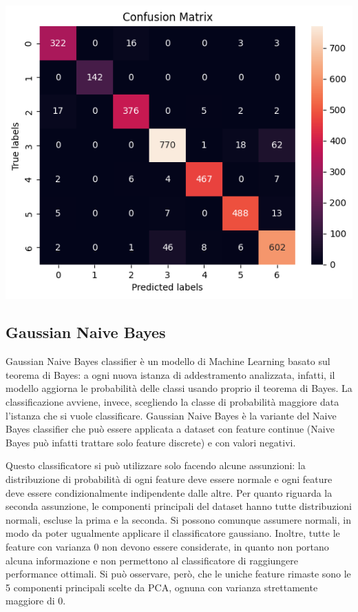 \begin{Figure}
    \centering
    \includegraphics[width=\linewidth]{img/svm_confusion_matrix.png}
\end{Figure}

\subsection{Gaussian Naive Bayes}
Gaussian Naive Bayes classifier è un modello di Machine Learning basato sul
teorema di Bayes: a ogni nuova istanza di addestramento analizzata, infatti,
il modello aggiorna le probabilità delle classi usando proprio il teorema di Bayes.
La classificazione avviene, invece, scegliendo la classe di probabilità maggiore
data l'istanza che si vuole classificare.
Gaussian Naive Bayes è la variante del Naive Bayes classifier che può essere applicata
a dataset con feature continue (Naive Bayes può infatti trattare solo feature 
discrete) e con valori negativi.

Questo classificatore si può utilizzare solo facendo alcune
assunzioni: la distribuzione di probabilità di ogni feature deve essere
normale e ogni feature deve essere condizionalmente indipendente dalle altre.
Per quanto riguarda la seconda assunzione, le componenti principali del dataset
hanno tutte distribuzioni normali, escluse la prima e la seconda. 
Si possono comunque assumere normali, in modo da poter ugualmente applicare il 
classificatore gaussiano.
Inoltre, tutte le feature con varianza 0 non devono essere considerate, in quanto
non portano alcuna informazione e non permettono al classificatore di 
raggiungere performance ottimali. Si può osservare, però, che le uniche feature
rimaste sono le 5 componenti principali scelte da PCA, ognuna con varianza
strettamente maggiore di 0.

